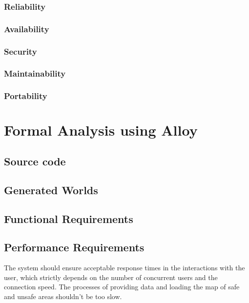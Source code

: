 \subsubsection{Reliability}
\subsubsection{Availability}
\subsubsection{Security}
\subsubsection{Maintainability}
\subsubsection{Portability}

\clearpage

\section{Formal Analysis using Alloy}

\subsection{Source code}
		
		
\subsection{Generated Worlds}

\clearpage





\subsection{Functional Requirements}


  	
\subsection{Performance Requirements}
	The system should ensure acceptable response times in the interactions with the user, which strictly depends on the number of concurrent users and the connection speed.
\newline
The processes of providing data and loading the map of safe and unsafe areas shouldn't be too slow.
